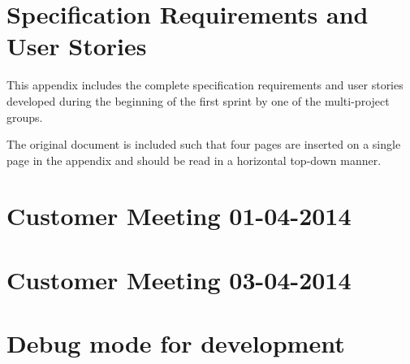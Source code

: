 \chapter{Specification Requirements and User Stories}\label{appendix:requirements}
This appendix includes the complete specification requirements and user stories developed during the beginning of the first sprint by one of the multi-project groups.

The original document is included such that four pages are inserted on a single page in the appendix and should be read in a horizontal top-down manner.



\chapter{Customer Meeting 01-04-2014}\label{appendix:firstmeeting}




\chapter{Customer Meeting 03-04-2014}\label{appendix:secondmeeting}



\chapter{Debug mode for development}
